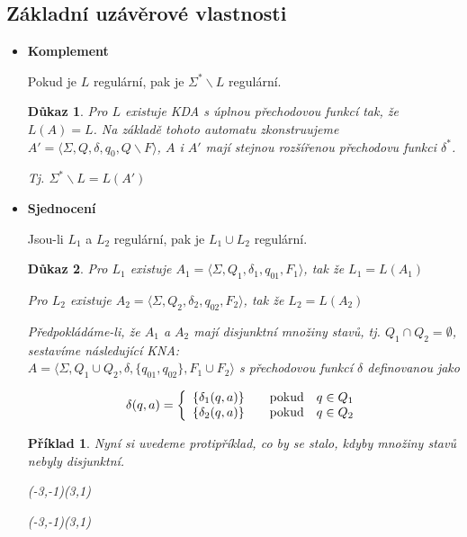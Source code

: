 \documentclass[10pt, a4paper, titlepage]{article}
\theoremstyle{note}
\newtheorem{dukaz}{Důkaz}
\newtheorem{priklad}{Příklad}
\newcommand{\aut}[1]{$A_#1= \langle \Sigma,Q_#1,\delta_#1,q_{0#1},F_#1 \rangle$}
\begin{document}
\subsection{Základní uzávěrové vlastnosti}

\begin{itemize}
\item
\textbf{Komplement}

Pokud je $L$ regulární, pak je $\Sigma^* \backslash L$ regulární.
\begin{dukaz}
Pro $L$ existuje KDA s úplnou přechodovou funkcí tak, že $L(A) = L$. Na základě tohoto automatu zkonstruujeme $A'=\langle \Sigma, Q, \delta,q_0,Q \backslash F \rangle$, $A$ i $A'$ mají stejnou rozšířenou přechodovu funkci $\delta^*$.

Tj. $\Sigma^* \backslash L = L(A')$
\end{dukaz}

\item
\textbf{Sjednocení} 

Jsou-li $L_1$ a $L_2$ regulární, pak je $L_1 \cup L_2$ regulární.

\begin{dukaz}
Pro $L_1$ existuje \aut{1}, tak že $L_1=L(A_1)$

Pro $L_2$ existuje \aut{2}, tak že $L_2=L(A_2)$

Předpokládáme-li, že $A_1$ a $A_2$ mají disjunktní množiny stavů, tj. $Q_1 \cap Q_2 = \emptyset$, sestavíme následující KNA:\\
$A=\langle \Sigma ,Q_1 \cup Q_2,\delta,\lbrace q_{01},q_{02} \rbrace,F_1 \cup F_2 \rangle$ s přechodovou funkcí $\delta$ definovanou jako

$$
\delta(q,a)=\left\{
\begin{array}{l@{\quad\mbox{}\quad}l}
\lbrace \delta_1(q,a) \rbrace & \text{pokud}\quad q \in Q_1\\
\lbrace \delta_2(q,a) \rbrace & \text{pokud}\quad q \in Q_2\\
\end{array}
\right.
$$
\end{dukaz}
\begin{priklad}
Nyní si uvedeme protipříklad, co by se stalo, kdyby množiny stavů nebyly disjunktní.

\begin{center}
\begin{VCPicture}{(-3,-1)(3,1)}
\end{VCPicture}
\end{center}
\begin{center}
\begin{VCPicture}{(-3,-1)(3,1)}
\end{VCPicture}
\end{center}


\end{priklad}
\end{itemize}
\end{document}
